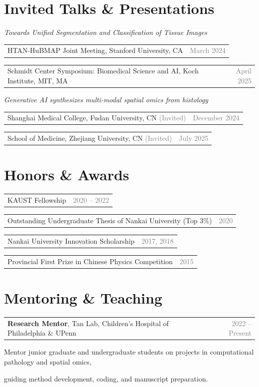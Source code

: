 \documentclass[11pt, letterpaper]{article}
\makeatletter
\newcommand{\cventry}[2]{%
  \noindent\begin{tabularx}{\textwidth}{@{}X r@{}}
    #1 & \textcolor{gray}{#2} \\
  \end{tabularx}\vspace{1pt}%
}
\makeatother
\begin{document}
\section{Invited Talks \& Presentations}

\textit{Towards Unified Segmentation and Classification of Tissue Images}

\vspace{4pt}
\cventry{\hspace{1em}HTAN-HuBMAP Joint Meeting, Stanford University, CA}{March 2024}
\cventry{\hspace{1em}Schmidt Center Symposium: Biomedical Science and AI, Koch Institute, MIT, MA}{April 2025}

\vspace{6pt}
\noindent \textit{Generative AI synthesizes multi-modal spatial omics from histology}

\vspace{4pt}
\cventry{\hspace{1em}Shanghai Medical College, Fudan University, CN \quad\textcolor{gray}{(Invited)}}{December 2024}
\cventry{\hspace{1em}School of Medicine, Zhejiang University, CN \quad\textcolor{gray}{(Invited)}}{July 2025}


\section{Honors \& Awards}

\cventry{KAUST Fellowship}{2020 -- 2022}
\cventry{Outstanding Undergraduate Thesis of Nankai University (Top 3\%)}{2020}
\cventry{Nankai University Innovation Scholarship}{2017, 2018}
\cventry{Provincial First Prize in Chinese Physics Competition}{2015}

\section{Mentoring \& Teaching}

\cventry{\textbf{Research Mentor}, Tan Lab, Children's Hospital of Philadelphia \& UPenn}{2022 -- Present}
\hspace{1em}Mentor junior graduate and undergraduate students on projects in computational pathology and spatial omics,\par
\hspace{1em}guiding method development, coding, and manuscript preparation.
\end{document}

